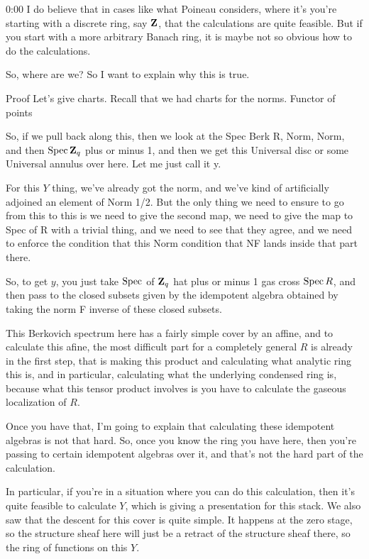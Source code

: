 \begin{unfinished}{0:00}
I do believe that in cases like what Poineau considers, where it's you're starting with a discrete ring, say $\mathbf Z$, that the calculations are quite feasible.
But if you start with a more arbitrary Banach ring, it is maybe not so obvious how to do the calculations.

So, where are we?
So I want to explain why this is true. 

Proof
Let's give charts.
Recall that we had charts for the norms.
Functor of points

So, if we pull back along this, then we look at the Spec Berk R, Norm, Norm, and then $\operatorname{Spec} \mathbf Z_q$ plus or minus 1, and then we get this Universal disc or some Universal annulus over here. Let me just call it y.

For this $Y$ thing, we've already got the norm, and we've kind of artificially adjoined an element of Norm 1/2. But the only thing we need to ensure to go from this to this is we need to give the second map, we need to give the map to Spec of R with a trivial thing, and we need to see that they agree, and we need to enforce the condition that this Norm condition that NF lands inside that part there.

So, to get $y$, you just take $\operatorname{Spec}$ of $\mathbf Z_q$ hat plus or minus 1 gas cross $\operatorname{Spec} R$, and then pass to the closed subsets given by the idempotent algebra obtained by taking the norm F inverse of these closed subsets.

This Berkovich spectrum here has a fairly simple cover by an affine, and to calculate this afine, the most difficult part for a completely general $R$ is already in the first step, that is making this product and calculating what analytic ring this is, and in particular, calculating what the underlying condensed ring is, because what this tensor product involves is you have to calculate the gaseous localization of $R$.

Once you have that, I'm going to explain that calculating these idempotent algebras is not that hard. So, once you know the ring you have here, then you're passing to certain idempotent algebras over it, and that's not the hard part of the calculation.

In particular, if you're in a situation where you can do this calculation, then it's quite feasible to calculate $Y$, which is giving a presentation for this stack. We also saw that the descent for this cover is quite simple. It happens at the zero stage, so the structure sheaf here will just be a retract of the structure sheaf there, so the ring of functions on this $Y$.


\end{unfinished}
